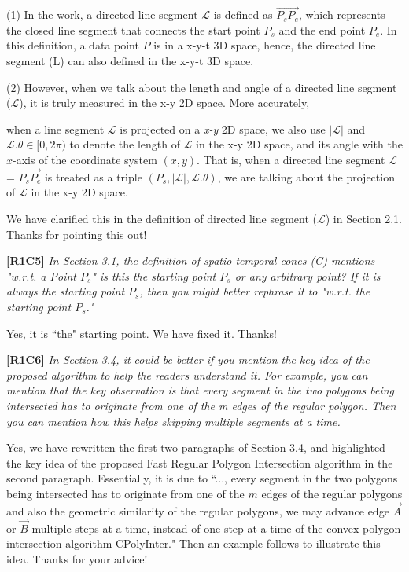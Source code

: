 \documentclass{letter}
\newcommand{\vv}{\overrightarrow}
\begin{document}
(1) In the work, a directed line segment $\mathcal{L}$ is defined as $\vv{P_{s}P_{e}}$, which represents the closed line segment that connects the start point $P_s$ and the end point $P_e$. In this definition, a data point $P$ is in a x-y-t 3D space, hence, the directed line segment (L) can also defined in the x-y-t 3D space.

(2) However, when we talk about the length and angle of a directed line segment ($\mathcal{L}$), it is truly measured in the x-y 2D space. More accurately, {when a line segment $\mathcal{L}$ is projected on a \emph{x-y} 2D space, we also use $|\mathcal{L}|$ and $\mathcal{L}.\theta\in [0, 2\pi)$ to denote the length of $\mathcal{L}$ in the x-y 2D space, and its angle with the $x$-axis of the coordinate system $(x, y)$.  That is, when a directed line segment $\mathcal{L}$ = $\vv{P_{s}P_{e}}$ is treated as a triple $(P_s, |\mathcal{L}|, \mathcal{L}.\theta)$, we are talking about the projection of $\mathcal{L}$ in the x-y 2D space.

We have clarified this in the definition of directed line segment ($\mathcal{L}$) in Section 2.1. Thanks for pointing this out!


\textbf{[R1C5]} \emph{In Section 3.1, the definition of spatio-temporal cones (C) mentions "w.r.t. a Point $P_s$" is this the starting point $P_s$ or any arbitrary point? If it is always the starting point $P_s$, then you might better rephrase it to "w.r.t. the starting point $P_s$."}

Yes, it is ``the" starting point. We have fixed it. Thanks!

\textbf{[R1C6]} \emph{In Section 3.4, it could be better if you mention the key idea of the proposed algorithm to help the readers understand it. For example, you can mention that the key observation is that every segment in the two polygons being intersected has to originate from one of the m edges of the regular polygon. Then you can mention how this helps skipping multiple segments at a time.}

Yes, we have rewritten the first two paragraphs of Section 3.4, and highlighted the key idea of the proposed Fast Regular Polygon Intersection algorithm in the second paragraph. {Essentially, it is due to ``..., every segment in the two polygons being intersected has to originate from one of the $m$ edges of the regular polygons and also the geometric similarity of the regular polygons,
we may advance edge $\vv{A}$ or $\vv{B}$ multiple steps at a time, instead of one step at a time of the convex polygon intersection algorithm CPolyInter."} Then an example follows to illustrate this idea.  Thanks for your advice!



}
\end{document}
